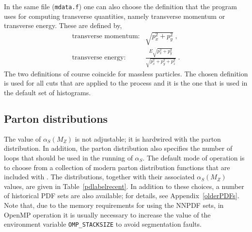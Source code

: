 \documentclass[12pt]{article}
\begin{document}
In the same file ({\tt mdata.f}) one can also choose the definition
that the program uses for computing transverse quantities, namely
transverse momentum or transverse energy. These are defined by,
\begin{eqnarray}
\mbox{transverse momentum:} & \sqrt{p_x^2+p_y^2} \; ,\nonumber \\
\mbox{transverse energy:}   &
 \frac{E \sqrt{p_x^2+p_y^2}}{\sqrt{p_x^2+p_y^2+p_z^2}} \; .
\end{eqnarray}
The two definitions of course coincide for massless particles.
The chosen definition is used for all cuts that are applied to the
process and it is the one that is used in the default set of histograms.

\subsection{Parton distributions}
The value of $\alpha_S(M_Z)$ is not adjustable; it is hardwired with the
parton distribution. In addition, the parton distribution also specifies
the number of loops that should be used in the running of $\alpha_S$.
The default mode of operation is to choose from a
collection of modern parton distribution functions that are included with
\MCFM.  The distributions, together with their associated $\alpha_S(M_Z)$
values, are given in Table~\ref{pdlabelrecent}.   In addition to these
choices, a number of historical PDF sets are also available;  for details, see
Appendix~\ref{olderPDFs}.  Note that, due to the memory requirements for
using the NNPDF sets, in OpenMP operation it is usually necessary to increase
the value of the environment variable {\tt OMP\_STACKSIZE} to avoid
segmentation faults.
%
\end{document}
